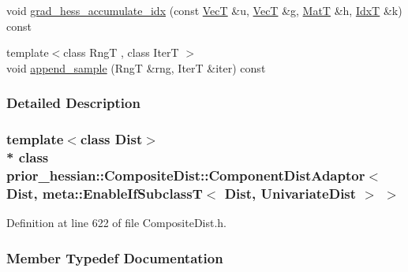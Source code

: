 \begin{DoxyCompactItemize}
\item 
void \hyperlink{classprior__hessian_1_1CompositeDist_1_1ComponentDistAdaptor_3_01Dist_00_01meta_1_1EnableIfSubclc6c9bd83bba546a81e521c87ad7ee6d3_ac58aa66e75b8ca803919fded5da5d5f9}{grad\+\_\+hess\+\_\+accumulate\+\_\+idx} (const \hyperlink{namespaceprior__hessian_a0b42fc70dec525d83fb2ac155d9ab974}{VecT} \&u, \hyperlink{namespaceprior__hessian_a0b42fc70dec525d83fb2ac155d9ab974}{VecT} \&g, \hyperlink{namespaceprior__hessian_aab58331a34ed4ef22b6022564fe74be3}{MatT} \&h, \hyperlink{namespaceprior__hessian_aa8d589f74e88bfa3b5750118acd1ab78}{IdxT} \&k) const 
\item 
{\footnotesize template$<$class RngT , class IterT $>$ }\\void \hyperlink{classprior__hessian_1_1CompositeDist_1_1ComponentDistAdaptor_3_01Dist_00_01meta_1_1EnableIfSubclc6c9bd83bba546a81e521c87ad7ee6d3_a763e7c16902f2d6464001fb02cbdd929}{append\+\_\+sample} (RngT \&rng, IterT \&iter) const 
\end{DoxyCompactItemize}


\subsubsection{Detailed Description}
\subsubsection*{template$<$class Dist$>$\\*
class prior\+\_\+hessian\+::\+Composite\+Dist\+::\+Component\+Dist\+Adaptor$<$ Dist, meta\+::\+Enable\+If\+Subclass\+T$<$ Dist, Univariate\+Dist $>$ $>$}



Definition at line 622 of file Composite\+Dist.\+h.



\subsubsection{Member Typedef Documentation}
